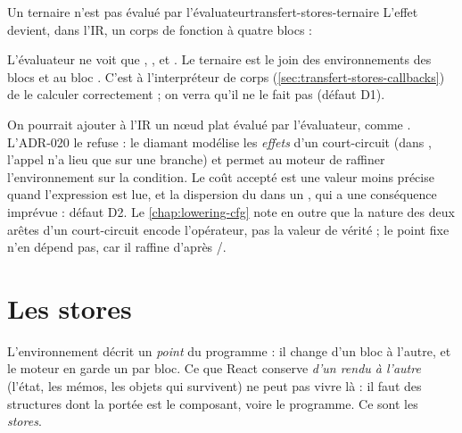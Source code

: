 \begin{exemple}{Un ternaire n'est pas évalué par l'évaluateur}{transfert-stores-ternaire}
  L'effet  devient, dans l'IR, un
  corps de fonction à quatre blocs :
  L'évaluateur ne voit que , ,  et
  . Le \og ternaire\fg{} est le join des environnements des blocs
   et  au bloc . C'est à l'interpréteur de corps
  (\cref{sec:transfert-stores-callbacks}) de le calculer correctement ; on
  verra qu'il ne le fait pas (défaut D1).
\end{exemple}

\begin{decision}
  On pourrait ajouter à l'IR un nœud plat  évalué par
  l'évaluateur, comme . L'ADR-020 le refuse : le diamant modélise
  les \emph{effets} d'un court-circuit (dans , l'appel
  n'a lieu que sur une branche) et permet au moteur de raffiner
  l'environnement sur la condition. Le coût accepté est une valeur moins
  précise quand l'expression est lue, et la dispersion du  dans un
  , qui a une conséquence imprévue : défaut D2. Le
  \cref{chap:lowering-cfg} note en outre que la nature des deux arêtes d'un
  court-circuit encode l'opérateur, pas la valeur de vérité ; le point fixe
  n'en dépend pas, car il raffine d'après /.
\end{decision}

\section{Les stores}
\label{sec:transfert-stores-stores}

L'environnement décrit un \emph{point} du programme : il change d'un bloc à
l'autre, et le moteur en garde un par bloc. Ce que React conserve
\emph{d'un rendu à l'autre} (l'état, les mémos, les objets qui survivent)
ne peut pas vivre là : il faut des structures dont la portée est le
composant, voire le programme. Ce sont les \emph{stores}.

